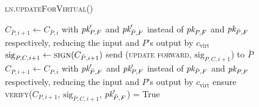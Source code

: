 \begin{figure}[H]
  \begin{processbox}{\textsc{ln}.\textsc{updateForVirtual}()}
    \begin{algorithmic}[1]
      \State $C_{\bar{P}, i+1} \gets C_{\bar{P}, i}$ with $\textit{pk}_{P, F}'$ and
      $\textit{pk}_{\bar{P}, F}'$ instead of $\textit{pk}_{P, F}$ and $\textit{pk}_{\bar{P}, F}$
      respectively, reducing the input and $P$'s output by $c_{\mathrm{virt}}$
      \State $\mathrm{sig}_{P, C, i+1} \gets \textsc{sign}(C_{\bar{P}, i+1})$
      \State send (\textsc{update forward}, $\mathrm{sig}_{P, C, i+1}$) to
      $\bar{P}$ \State {}
      \State {}
      \State {}
      \State {}
      \State {} 
      \State {}
      \State $C_{P, i+1} \gets C_{P, i}$ with $\textit{pk}_{\bar{P}, F}'$ and $\textit{pk}_{P,
      F}'$ instead of $\textit{pk}_{\bar{P}, F}$ and $\textit{pk}_{P, F}$ respectively, reducing
      the input and $P$'s output by $c_{\mathrm{virt}}$
      \State ensure \textsc{verify}($C_{P, i+1}$, $\mathrm{sig}_{\bar{P}, C,
      i+1}$, $\textit{pk}_{\bar{P}, F}'$) = True
    \end{algorithmic}
  \end{processbox}
  \caption{}
  \label{code:ln:open:virtual-update}
\end{figure}

